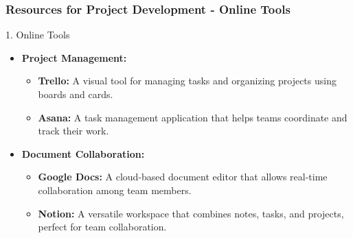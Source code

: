 \documentclass[aspectratio=169]{beamer}
\begin{document}
\begin{frame}[fragile]
    \frametitle{Resources for Project Development - Online Tools}
    \begin{block}{1. Online Tools}
        \begin{itemize}
            \item \textbf{Project Management:}
                \begin{itemize}
                    \item \textbf{Trello:} A visual tool for managing tasks and organizing projects using boards and cards.
                    \item \textbf{Asana:} A task management application that helps teams coordinate and track their work.
                \end{itemize}
            \item \textbf{Document Collaboration:}
                \begin{itemize}
                    \item \textbf{Google Docs:} A cloud-based document editor that allows real-time collaboration among team members.
                    \item \textbf{Notion:} A versatile workspace that combines notes, tasks, and projects, perfect for team collaboration.
                \end{itemize}
        \end{itemize}
    \end{block}
\end{frame}
\end{document}
